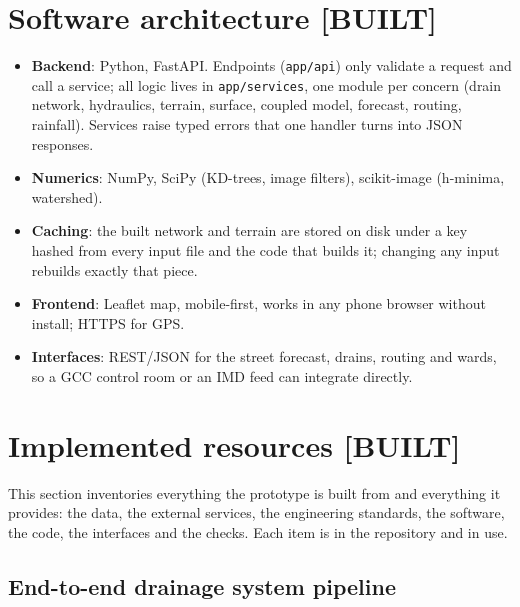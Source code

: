 \documentclass[11pt,a4paper]{article}
\newcommand{\built}{\textcolor{built}{\small\textbf{[BUILT]}}}
\begin{document}
\section{Software architecture \built}

\begin{itemize}
  \item \textbf{Backend}: Python, FastAPI. Endpoints (\texttt{app/api}) only validate a
        request and call a service; all logic lives in \texttt{app/services}, one module
        per concern (drain network, hydraulics, terrain, surface, coupled model,
        forecast, routing, rainfall). Services raise typed errors that one handler turns
        into JSON responses.
  \item \textbf{Numerics}: NumPy, SciPy (KD-trees, image filters), scikit-image
        (h-minima, watershed).
  \item \textbf{Caching}: the built network and terrain are stored on disk under a key
        hashed from every input file and the code that builds it; changing any input
        rebuilds exactly that piece.
  \item \textbf{Frontend}: Leaflet map, mobile-first, works in any phone browser without
        install; HTTPS for GPS.
  \item \textbf{Interfaces}: REST/JSON for the street forecast, drains, routing and
        wards, so a GCC control room or an IMD feed can integrate directly.
\end{itemize}

\section{Implemented resources \built}
\label{sec:resources}

This section inventories everything the prototype is built from and everything it
provides: the data, the external services, the engineering standards, the software,
the code, the interfaces and the checks. Each item is in the repository and in use.

\subsection{End-to-end drainage system pipeline}
\end{document}
